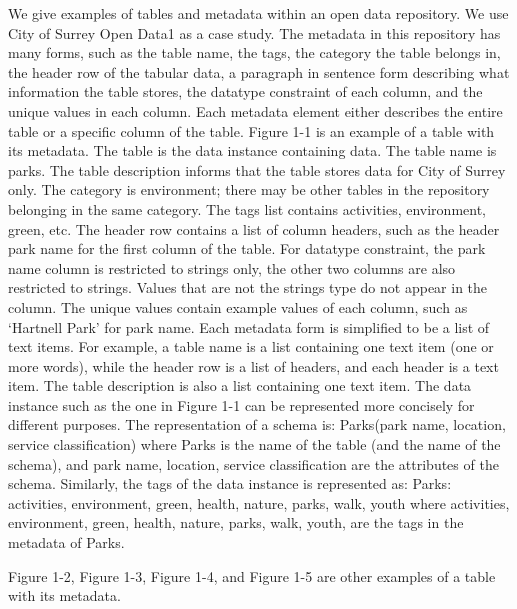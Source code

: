 We give examples of tables and metadata within an open data repository. We use City of Surrey Open Data1 as a case study. The metadata in this repository has many forms, such as the table name, the tags, the category the table belongs in, the header row of the tabular data, a paragraph in sentence form describing what information the table stores, the datatype constraint of each column, and the unique values in each column. Each metadata element either describes the entire table or a specific column of the table. Figure 1-1 is an example of a table with its metadata. The table is the data instance containing data. The table name is parks. The table description informs that the table stores data for City of Surrey only. The category is environment; there may be other tables in the repository belonging in the same category. The tags list contains activities, environment, green, etc. The header row contains a list of column headers, such as the header park name for the first column of the table. For datatype constraint, the park name column is restricted to strings only, the other two columns are also restricted to strings. Values that are not the strings type do not appear in the column. The unique values contain example values of each column, such as ‘Hartnell Park’ for park name.
Each metadata form is simplified to be a list of text items. For example, a table name is a list containing one text item (one or more words), while the header row is a list of headers, and each header is a text item. The table description is also a list containing one text item.
The data instance such as the one in Figure 1-1 can be represented more concisely for different purposes. The representation of a schema is:
Parks(park name, location, service classification)
where Parks is the name of the table (and the name of the schema), and park name, location, service classification are the attributes of the schema.
Similarly, the tags of the data instance is represented as:
Parks: {activities, environment, green, health, nature, parks, walk, youth}
where activities, environment, green, health, nature, parks, walk, youth, are the tags in the metadata of Parks.

Figure 1-2, Figure 1-3, Figure 1-4, and Figure 1-5 are other examples of a table with its metadata.

